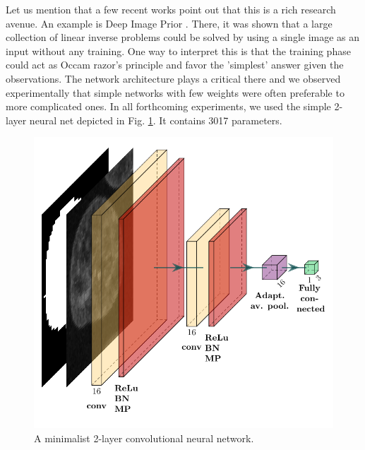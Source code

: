\documentclass{article}
\begin{document}
Let us mention that a few recent works point out that this is a rich research avenue. 
An example is Deep Image Prior \cite{lempitsky2018deep}. 
There, it was shown that a large collection of linear inverse problems could be solved by using a single image as an input without any training. 
One way to interpret this is that the training phase could act as Occam razor's principle and favor the 'simplest' answer given the observations.
The network architecture plays a critical there and we observed experimentally that simple networks with few weights were often preferable to more complicated ones.
In all forthcoming experiments, we used the simple 2-layer neural net depicted in Fig. \ref{fig:CNN2D}. It contains 3017 parameters.
\begin{figure}[h!]{}
 \centering
 \includegraphics[width=0.7\linewidth]{Figures/myfirstcnn.pdf}
  \caption{A minimalist 2-layer convolutional neural network. \label{fig:CNN2D}}
\end{figure}



\end{document}

